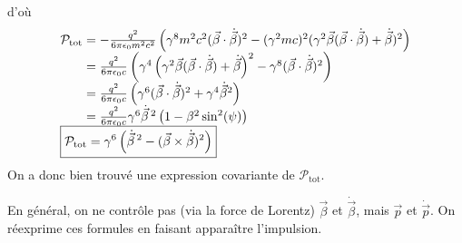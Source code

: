 d'où
$$
	\begin{array}{r@{\;}l}
		\mathcal{P}_\text{tot}&=-\frac{q^2}{6\pi\epsilon_0m^2c^2}\left(
			\gamma^8m^2c^2(\vec{\beta}\cdot\dot{\vec{\beta}})^2
			-(\gamma^2mc)^2(\gamma^2\vec{\beta}(\vec{\beta}\cdot\dot{\vec{\beta}})+\dot{\vec{\beta}})^2
			\right)\\
		&=\frac{q^2}{6\pi\epsilon_0c}\left(
			\gamma^4\left(\gamma^2\vec{\beta}(\vec{\beta}\cdot\dot{\vec{\beta}})+\dot{\vec{\beta}}\right)^2
			-\gamma^8(\vec{\beta}\cdot\dot{\vec{\beta}})^2\right)\\
		&=\frac{q^2}{6\pi\epsilon_0c}\left(\gamma^6(\vec{\beta}\cdot\dot{\vec{\beta}})^2
			+\gamma^4\dot{\vec{\beta}}^2\right)\\
		&=\frac{q^2}{6\pi\epsilon_0c}\gamma^6\dot{\vec{\beta}}\,^2\left(
			1-\beta^2\sin^2(\psi)\right)\\
		\multicolumn{2}{l}{\boxed{\mathcal{P}_\text{tot}=\gamma^6\left(\dot{\vec{\beta}}\,^2-
			(\vec{\beta}\times\dot{\vec{\beta}})^2\right)}}
	\end{array}
$$
On a donc bien trouvé une expression covariante de $\mathcal{P}_\text{tot}$.

\begin{remark}
En général, on ne contrôle pas (via la force de Lorentz) $\vec{\beta}$ et $\dot{\vec{\beta}}$, mais $\vec{p}$ et $\dot{\vec{p}}$. On réexprime ces formules en faisant apparaître l'impulsion.
\end{remark}